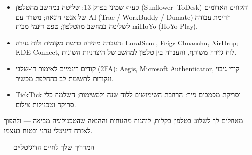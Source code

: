 
\begin{itemize}
  \item סעיף שמיני בפרק 13: שליטה במחשב מהטלפון (Sunflower, ToDesk) והקווים האדומים של אנטי-הונאה; משרד עם AI (Trae / WorkBuddy / Dumate) וזרימת עבודה לשליטה במחשב מהטלפון; טפט דינמי מבית miHoYo (HoYo Play).
  \item העברה מהירה ברשת מקומית ולוח גזירה: LocalSend, Feige Chuanshu, AirDrop; KDE Connect, לוח גזירה משותף, והעברה בין טלפון למחשב של היצרניות השונות.
  \item קודים דינמיים לאימות דו-שלבי (2FA): Aegis, Microsoft Authenticator, קודי גיבוי ונקודות לתשומת לב בהחלפת מכשיר.
  \item TickTick וסריקת מסמכים נייר: הרחבת השימושים ללוח שנה ולמשימות; השלמת כלי סריקה וטכניקות צילום.
\end{itemize}

מאחלים לך לשלוט בטלפון בקלות, ליהנות מהנוחות וההנאה שהטכנולוגיה מביאה — ולהפוך לאזרח דיגיטלי ערני ובטוח בעצמו.

— המדריך שלך לחיים הדיגיטליים
